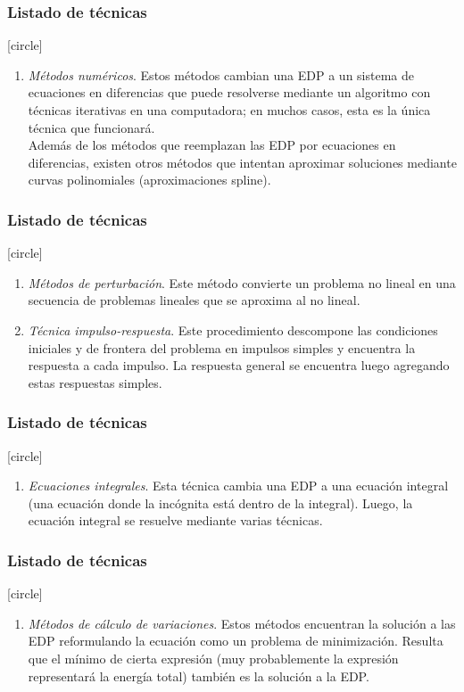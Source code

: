 \documentclass[12pt]{beamer}
\begin{document}
\begin{frame}
\frametitle{Listado de técnicas}
[circle]
\begin{enumerate}[<+->]
\conti    
\item \emph{Métodos numéricos}. Estos métodos cambian una EDP a un sistema de ecuaciones en diferencias que puede resolverse mediante un algoritmo con técnicas iterativas en una computadora; en muchos casos, esta es la única técnica que funcionará.
\\
\bigskip
\pause
Además de los métodos que reemplazan las EDP por ecuaciones en diferencias, existen otros métodos que intentan aproximar soluciones mediante curvas polinomiales (aproximaciones spline).
\seti
\end{enumerate}
\end{frame}
\begin{frame}
\frametitle{Listado de técnicas}
[circle]
\begin{enumerate}[<+->]
\conti    
\item \emph{Métodos de perturbación}. Este método convierte un problema no lineal en una secuencia de problemas lineales que se aproxima al no lineal.
\item \emph{Técnica impulso-respuesta}. Este procedimiento descompone las condiciones iniciales y de frontera del problema en impulsos simples y encuentra la respuesta a cada impulso. La respuesta general se encuentra luego agregando estas respuestas simples.
\seti
\end{enumerate}
\end{frame}
\begin{frame}
\frametitle{Listado de técnicas}
[circle]
\begin{enumerate}[<+->]
\conti    
\item \emph{Ecuaciones integrales}. Esta técnica cambia una EDP a una ecuación integral (una ecuación donde la incógnita está dentro de la integral). Luego, la ecuación integral se resuelve mediante varias técnicas.
\seti
\end{enumerate}
\end{frame}
\begin{frame}
\frametitle{Listado de técnicas}
[circle]
\begin{enumerate}[<+->]
\conti    
\item \emph{Métodos de cálculo de variaciones}. Estos métodos encuentran la solución a las EDP reformulando la ecuación como un problema de minimización. Resulta que el mínimo de cierta expresión (muy probablemente la expresión representará la energía total) también es la solución a la EDP.
\seti
\end{enumerate}
\end{frame}
\end{document}
